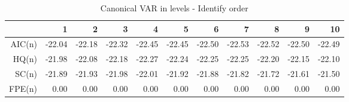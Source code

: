 \begin{table}[ht]
\centering
\caption{Canonical VAR in levels - Identify order} 
\begin{tabular}{rrrrrrrrrrr}
  \hline
 & 1 & 2 & 3 & 4 & 5 & 6 & 7 & 8 & 9 & 10 \\ 
  \hline
AIC(n) & -22.04 & -22.18 & -22.32 & -22.45 & -22.45 & -22.50 & -22.53 & -22.52 & -22.50 & -22.49 \\ 
  HQ(n) & -21.98 & -22.08 & -22.18 & -22.27 & -22.24 & -22.25 & -22.25 & -22.20 & -22.15 & -22.10 \\ 
  SC(n) & -21.89 & -21.93 & -21.98 & -22.01 & -21.92 & -21.88 & -21.82 & -21.72 & -21.61 & -21.50 \\ 
  FPE(n) & 0.00 & 0.00 & 0.00 & 0.00 & 0.00 & 0.00 & 0.00 & 0.00 & 0.00 & 0.00 \\ 
   \hline
\end{tabular}
\end{table}
